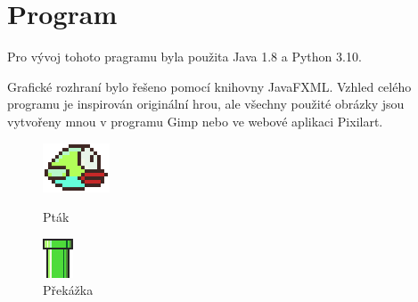 \section{Program}
Pro vývoj tohoto pragramu byla použita Java 1.8 a Python 3.10.

Grafické rozhraní bylo řešeno pomocí knihovny JavaFXML. Vzhled celého programu je inspirován originální hrou, ale všechny použité obrázky jsou vytvořeny mnou v programu Gimp nebo ve webové aplikaci Pixilart.

\begin{figure}[!htb]
   \begin{minipage}{0.4\textwidth}
     \centering
     \includegraphics[width=.7\linewidth]{images/Bird.png}
     \caption{Pták}\label{Fig:Data1}
   \end{minipage}\hfill
   \begin{minipage}{0.4\textwidth}
     \centering
     \includegraphics[width=.7\linewidth]{images/BottomPillar.png}
     \caption{Překážka}\label{Fig:Data2}
   \end{minipage}
\end{figure}

